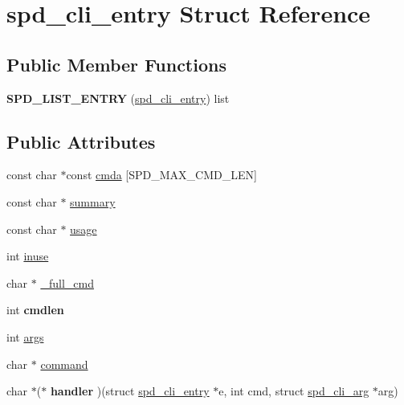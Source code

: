 \hypertarget{structspd__cli__entry}{
\section{spd\_\-cli\_\-entry Struct Reference}
\label{structspd__cli__entry}
}
\subsection*{Public Member Functions}
\begin{DoxyCompactItemize}
\item 
\hypertarget{structspd__cli__entry_a7294b69ec7220bc960424ff73dbd3773}{
{\bfseries SPD\_\-LIST\_\-ENTRY} (\hyperlink{structspd__cli__entry}{spd\_\-cli\_\-entry}) list}
\label{structspd__cli__entry_a7294b69ec7220bc960424ff73dbd3773}

\end{DoxyCompactItemize}
\subsection*{Public Attributes}
\begin{DoxyCompactItemize}
\item 
const char $\ast$const \hyperlink{structspd__cli__entry_a044d985635ef8af84a2a30fd70e770bd}{cmda} \mbox{[}SPD\_\-MAX\_\-CMD\_\-LEN\mbox{]}
\item 
const char $\ast$ \hyperlink{structspd__cli__entry_aea9782355ada46b1dde2b29432611d91}{summary}
\item 
const char $\ast$ \hyperlink{structspd__cli__entry_a2f3d729e3a87a6056df8376b672a6fbd}{usage}
\item 
int \hyperlink{structspd__cli__entry_a81ccbdf325956499ab2020bcf6adea7b}{inuse}
\item 
char $\ast$ \hyperlink{structspd__cli__entry_a348ca53d3bc1548c92303252202ad907}{\_\-full\_\-cmd}
\item 
\hypertarget{structspd__cli__entry_a40ef5125edfc86a46afb4eaf5b698086}{
int {\bfseries cmdlen}}
\label{structspd__cli__entry_a40ef5125edfc86a46afb4eaf5b698086}

\item 
int \hyperlink{structspd__cli__entry_a35165ff8a1a0e5780131566c706bd782}{args}
\item 
char $\ast$ \hyperlink{structspd__cli__entry_a14d5467446365ddaefbbf559dd8a19c8}{command}
\item 
\hypertarget{structspd__cli__entry_a5d635766c68a5f11a096dfade04d7730}{
char $\ast$($\ast$ {\bfseries handler} )(struct \hyperlink{structspd__cli__entry}{spd\_\-cli\_\-entry} $\ast$e, int cmd, struct \hyperlink{structspd__cli__arg}{spd\_\-cli\_\-arg} $\ast$arg)}
\label{structspd__cli__entry_a5d635766c68a5f11a096dfade04d7730}

\end{DoxyCompactItemize}


